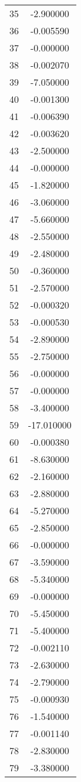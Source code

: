 \documentclass[12pt]{article}
\begin{document}
\begin{longtable}{@{}cc@{}}
35 & -2.900000 \\
36 & -0.005590 \\
37 & -0.000000 \\
38 & -0.002070 \\
39 & -7.050000 \\
40 & -0.001300 \\
41 & -0.006390 \\
42 & -0.003620 \\
43 & -2.500000 \\
44 & -0.000000 \\
45 & -1.820000 \\
46 & -3.060000 \\
47 & -5.660000 \\
48 & -2.550000 \\
49 & -2.480000 \\
50 & -0.360000 \\
51 & -2.570000 \\
52 & -0.000320 \\
53 & -0.000530 \\
54 & -2.890000 \\
55 & -2.750000 \\
56 & -0.000000 \\
57 & -0.000000 \\
58 & -3.400000 \\
59 & -17.010000 \\
60 & -0.000380 \\
61 & -8.630000 \\
62 & -2.160000 \\
63 & -2.880000 \\
64 & -5.270000 \\
65 & -2.850000 \\
66 & -0.000000 \\
67 & -3.590000 \\
68 & -5.340000 \\
69 & -0.000000 \\
70 & -5.450000 \\
71 & -5.400000 \\
72 & -0.002110 \\
73 & -2.630000 \\
74 & -2.790000 \\
75 & -0.000930 \\
76 & -1.540000 \\
77 & -0.001140 \\
78 & -2.830000 \\
79 & -3.380000 \\

\end{longtable}
\end{document}
